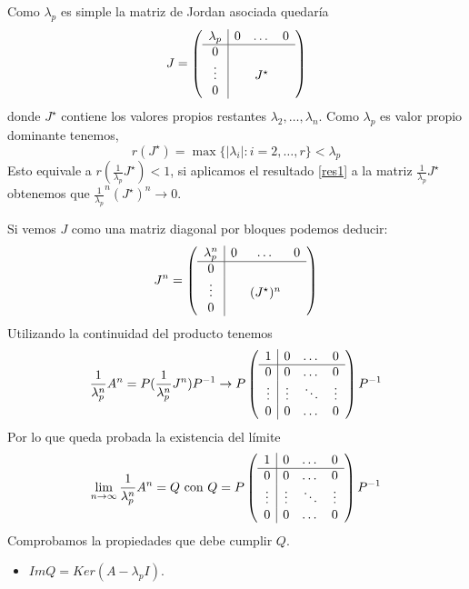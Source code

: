 \documentclass[size=a4, parskip=half, titlepage=false, toc=flat, toc=bib, 12pt]{scrartcl}
\makeatletter
\renewenvironment{proof}[1][\proofname] {\par\pushQED{\qed}\normalfont\topsep6\p@\@plus6\p@\relax\trivlist\item[\hskip\labelsep\itshape\tgpaella#1\@addpunct{.}]\ignorespaces}{\popQED\endtrivlist\@endpefalse}
\theoremstyle{theorem-style}
\theoremstyle{definition-style}
\theoremstyle{remark-style}
\theoremstyle{example-style}
\theoremstyle{definition-style}
\theoremstyle{remark-style}
\makeatother
\begin{document}
\begin{proof}
Como $\lambda_p$ es simple la matriz de Jordan asociada quedaría $$
  J =
    \left(
      \begin{array}{{c|ccc}}
        \lambda_p     &    0      &   \dots    & 0\\\hline
            0         &           &        &  \\
            \vdots    &           & J^{\star} &  \\
           0          &           &        &
      \end{array}
    \right)
$$ donde $J^{\star}$ contiene los valores propios restantes $\lambda_2, \dots, \lambda_n$.
Como $\lambda_p$ es valor propio dominante tenemos,
$$r(J^{\star}) = \max \{ |\lambda_i| : i = 2, \dots , r \} < \lambda_p $$
Esto equivale a $r(\frac{1}{\lambda_p} J^{\star}) < 1$, si aplicamos el resultado \ref{res1} a la matriz $\frac{1}{\lambda_p} J^{\star}$ obtenemos que $\frac{1}{\lambda_p}^n (J^{\star})^n \rightarrow 0$.

Si vemos $J$ como una matriz diagonal por bloques podemos deducir:
$$J^n =      \left(
      \begin{array}{{c|ccc}}
        \lambda_p^n     &    0      &   \dots    & 0\\\hline
            0         &           &        &  \\
            \vdots    &           & (J^{\star})^n &  \\
           0          &           &        &
      \end{array}
    \right)$$
Utilizando la continuidad del producto tenemos
$$\frac{1}{\lambda_p^n} A^n = P (\frac{1}{\lambda_p^n}  J^n)P^{-1} \rightarrow P \left(
      \begin{array}{{c|ccc}}
            1         &    0      &   \dots    & 0\\\hline
            0         &    0       &    \dots    & 0 \\
            \vdots    &    \vdots  &  \ddots &  \vdots \\
           0          &     0       &    \dots    & 0
      \end{array}   \right) P^{-1}$$
Por lo que queda probada la existencia del límite
$$\lim_{n \to \infty} \frac{1}{\lambda_p^n} A^n  = Q \  \textrm{con} \ Q = P \left(
      \begin{array}{{c|ccc}}
            1         &    0      &   \dots    & 0\\\hline
            0         &    0       &    \dots    & 0 \\
            \vdots    &    \vdots  &  \ddots &  \vdots \\
           0          &     0       &    \dots    & 0
      \end{array}   \right) P^{-1} $$
Comprobamos la propiedades que debe cumplir $Q$.
\begin{itemize}
\item $Im Q = Ker (A - \lambda_p I)$.


\end{itemize}
\end{proof}
\end{document}
